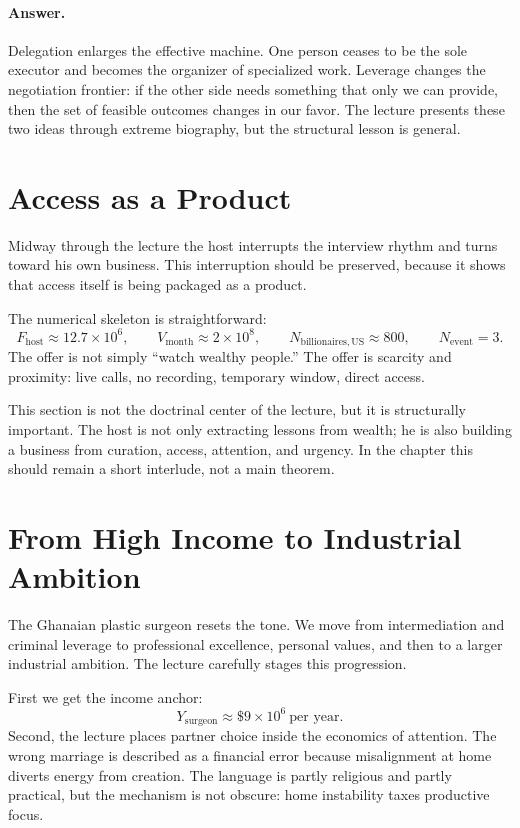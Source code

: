 \paragraph{Answer.} Delegation enlarges the effective machine. One person ceases to be the sole executor and becomes the organizer of specialized work. Leverage changes the negotiation frontier: if the other side needs something that only we can provide, then the set of feasible outcomes changes in our favor. The lecture presents these two ideas through extreme biography, but the structural lesson is general.

\section{Access as a Product}

Midway through the lecture the host interrupts the interview rhythm and turns toward his own business. This interruption should be preserved, because it shows that access itself is being packaged as a product.

The numerical skeleton is straightforward:
\begin{equation}
F_{\mathrm{host}}\approx 12.7\times 10^6, \qquad
V_{\mathrm{month}}\approx 2\times 10^8, \qquad
N_{\mathrm{billionaires,US}}\approx 800, \qquad
N_{\mathrm{event}}=3.
\end{equation}
The offer is not simply ``watch wealthy people.'' The offer is scarcity and proximity: live calls, no recording, temporary window, direct access.

This section is not the doctrinal center of the lecture, but it is structurally important. The host is not only extracting lessons from wealth; he is also building a business from curation, access, attention, and urgency. In the chapter this should remain a short interlude, not a main theorem.

\section{From High Income to Industrial Ambition}

The Ghanaian plastic surgeon resets the tone. We move from intermediation and criminal leverage to professional excellence, personal values, and then to a larger industrial ambition. The lecture carefully stages this progression.

First we get the income anchor:
\begin{equation}
Y_{\mathrm{surgeon}}\approx \$9\times 10^6 \ \text{per year}.
\end{equation}
Second, the lecture places partner choice inside the economics of attention. The wrong marriage is described as a financial error because misalignment at home diverts energy from creation. The language is partly religious and partly practical, but the mechanism is not obscure: home instability taxes productive focus.

